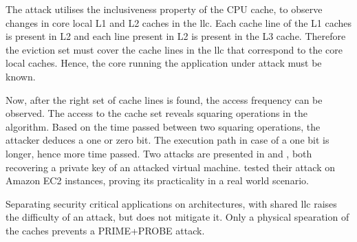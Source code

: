 The attack utilises the inclusiveness property of the CPU cache, to observe
changes in core local L1 and L2 caches in the \gls{llc}.
Each cache line of the L1 caches is present in L2 and each line present in L2
is present in the L3 cache.
Therefore the eviction set must cover the cache lines in the \gls{llc} that
correspond to the core local caches.
Hence, the core running the application under attack must be known.

Now, after the right set of cache lines is found, the access frequency can be
observed.
The access to the cache set reveals squaring operations in the algorithm.
Based on the time passed between two squaring operations, the attacker deduces
a one or zero bit.
The execution path in case of a one bit is longer, hence more time passed.
Two attacks are presented in \cite{liu_last-level_2015} and
\cite{inci_seriously_2015}, both recovering a private key of an attacked
virtual machine.
\citeauthor{inci_seriously_2015} tested their attack on Amazon EC2 instances,
proving its practicality in a real world scenario.

Separating security critical applications on architectures, with shared
\gls{llc} raises the difficulty of an attack, but does not mitigate it.
Only a physical spearation of the caches prevents a PRIME+PROBE attack.






